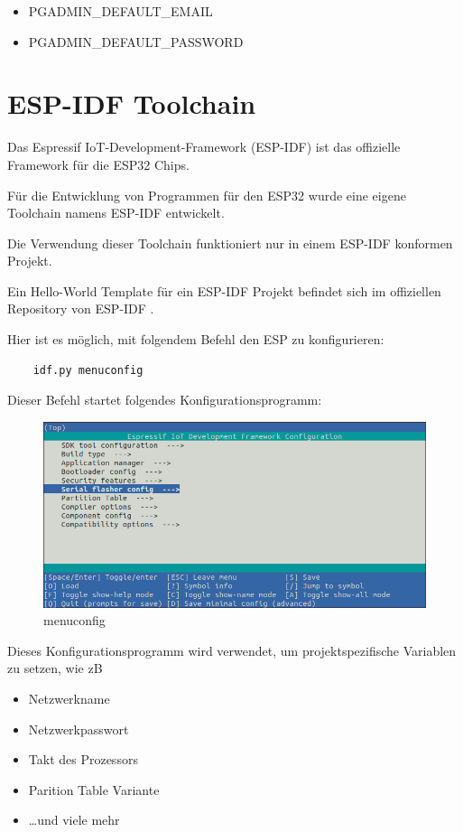 \begin{itemize}
    \item PGADMIN\_DEFAULT\_EMAIL
    \item PGADMIN\_DEFAULT\_PASSWORD
\end{itemize}

\pagebreak

\section{ESP-IDF Toolchain}\label{sec:esp-idf-toolchain}

Das Espressif IoT-Development-Framework (ESP-IDF) ist das offizielle Framework für die ESP32 Chips. \cite{esp-idf-github}

Für die Entwicklung von Programmen für den ESP32 wurde eine eigene Toolchain namens ESP-IDF entwickelt.

Die Verwendung dieser Toolchain funktioniert nur in einem ESP-IDF konformen Projekt.

Ein Hello-World Template für ein ESP-IDF Projekt befindet sich im offiziellen Repository von ESP-IDF \cite{esp-idf-github-template}.

Hier ist es möglich, mit folgendem Befehl den ESP zu konfigurieren:

\begin{verbatim}
    idf.py menuconfig
\end{verbatim}

Dieser Befehl startet folgendes Konfigurationsprogramm:
\begin{figure}[H]
    \begin{center}
        \includegraphics[scale=0.5]{images/menuconfig.png}
        \caption{menuconfig \cite{menuconfig_picture}}
    \end{center}
\end{figure}
Dieses Konfigurationsprogramm wird verwendet, um projektspezifische Variablen zu setzen, wie zB
\begin{itemize}
    \item Netzwerkname
    \item Netzwerkpasswort
    \item Takt des Prozessors
    \item Parition Table Variante
    \item \dots und viele mehr
\end{itemize}

